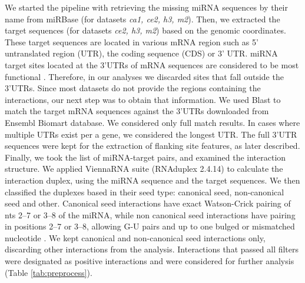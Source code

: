 \documentclass{bmcart}
\begin{document}
We started the pipeline with retrieving the missing miRNA sequences by their name from miRBase (for datasets  \textit{ca1, ce2, h3, m2}). Then, we extracted the target sequences (for datasets \textit{ce2, h3, m2}) based on the genomic coordinates. These target sequences are located in various mRNA region such as 5’ untranslated region (UTR), the coding sequence (CDS) or 3’ UTR. miRNA target sites located at the 3’UTRs of mRNA sequences are considered to be most functional \cite{menor2014mirmark, baek2008impact}. Therefore, in our analyses we discarded sites that fall outside the 3’UTRs. Since most datasets do not provide the regions containing the interactions, our next step was to obtain that information. We used Blast \cite{altschul1990basic_blast} to match the target mRNA sequences against the 3'UTRs downloaded from Ensembl Biomart database. We considered only full match results. In cases where multiple UTRs exist per a gene, we considered the longest UTR. The full 3'UTR sequences were kept for the extraction of flanking site features, as later described. Finally, we took the list of miRNA-target pairs, and examined the interaction structure. We applied ViennaRNA suite (RNAduplex 2.4.14) \cite{lorenz2011viennarna} to calculate the interaction duplex, using the miRNA sequence and the target sequences. We then classified the duplexes based in their seed type: canonical seed, non-canonical seed and other. Canonical seed interactions have exact Watson-Crick pairing of nts 2–7 or 3–8 of the miRNA, while non canonical seed interactions have pairing in positions 2–7 or 3–8, allowing G-U pairs and up to one bulged or mismatched nucleotide \cite{helwak2013mapping}. We kept canonical and non-canonical seed interactions only, discarding other interactions from the analysis.
Interactions that passed all filters were designated as positive interactions and were considered for further analysis (Table \ref{tab:preprocess}).
\end{document}
